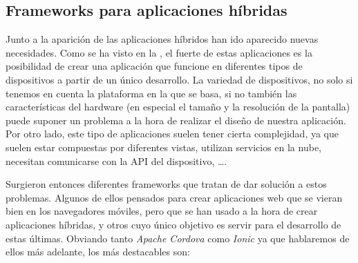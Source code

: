 \subsection{Frameworks para aplicaciones híbridas}

\cite{Top10FramHybApp,TopFramHybApp} Junto a la aparición de las aplicaciones híbridos han ido aparecido nuevas necesidades. Como se ha visto en la , el fuerte de estas aplicaciones es la posibilidad de crear una aplicación que funcione en diferentes tipos de dispositivos a partir de un único desarrollo. La variedad de dispositivos, no solo si tenemos en cuenta la plataforma en la que se basa, si no también las características del hardware (en especial el tamaño y la resolución de la pantalla) puede suponer un problema a la hora de realizar el diseño de nuestra aplicación. Por otro lado, este tipo de aplicaciones suelen tener cierta complejidad, ya que suelen estar compuestas por diferentes vistas, utilizan servicios en la nube, necesitan comunicarse con la \gls{API} del dispositivo, \ldots.

Surgieron entonces diferentes frameworks que tratan de dar solución a estos problemas. Algunos de ellos pensados para crear aplicaciones web que se vieran bien en los navegadores móviles, pero que se han usado a la hora de crear aplicaciones híbridas, y otros cuyo único objetivo es servir para el desarrollo de estas últimas. Obviando tanto \emph{Apache Cordova} como \emph{Ionic} ya que hablaremos de ellos más adelante, los más destacables son:

